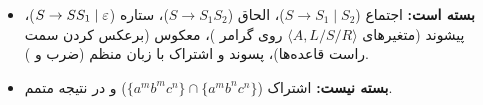 \begin{summary}
\begin{itemize}
\item \textbf{بسته است:} اجتماع ($S\to S_1\mid S_2$)، الحاق ($S\to S_1S_2$)، ستاره ($S\to SS_1\mid\varepsilon$)، پیشوند (متغیرهای $\langle A,L/S/R\rangle$ روی گرامر )، معکوس (برعکس کردن سمت راست قاعده‌ها)، پسوند و اشتراک با زبان منظم (ضرب  و ).
\item \textbf{بسته نیست:} اشتراک ($\{a^mb^mc^n\}\cap\{a^mb^nc^n\}$) و در نتیجه متمم.
\end{itemize}
\end{summary}
